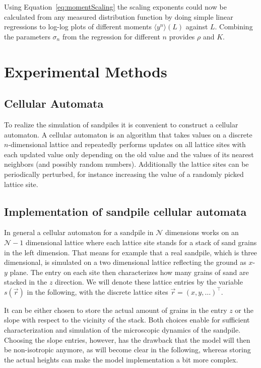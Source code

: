 Using Equation~\eqref{eq:momentScaling} the scaling exponents could now be calculated from any measured distribution
function by doing simple linear regressions to log-log plots of different moments $\langle y^n\rangle (L)$ against $L$.
Combining the parameters $\sigma_n$ from the regression for different $n$ provides $\rho$ and $K$.

\section{Experimental Methods}
\label{sec:experiment}

\subsection{Cellular Automata}
\label{sec:cellularAutomata}
To realize the simulation of sandpiles it is convenient to construct a cellular automaton.
A cellular automaton is an algorithm that takes values on a discrete $n$-dimensional lattice and repeatedly performs
updates on all lattice sites with each updated value only depending on the old value and the values of its nearest
neighbors (and possibly random numbers). Additionally the lattice sites can be periodically perturbed, for instance
increasing the value of a randomly picked lattice site.

\subsection{Implementation of sandpile cellular automata}
\label{sec:sandpileImplementation}
In general a cellular automaton for a sandpile in $\mathcal{N}$ dimensions works on an $\mathcal{N}-1$ dimensional
lattice where each lattice site stands for a stack of sand grains in the left dimension. That means for example that
a real sandpile, which is three dimensional, is simulated on a two dimensional lattice reflecting the ground as $x$-$y$
plane. The entry on each site then characterizes how many grains of sand are stacked in the $z$ direction.
We will denote these lattice entries by the variable $s(\vec{r})$ in the following, with the discrete lattice sites
$\vec{r}=(x,y,\ldots)^\top$.

It can be either chosen to store the actual amount of grains in the entry $z$ or the slope with respect to the
vicinity of the stack. Both choices enable for sufficient characterization and simulation of the microscopic
dynamics of the sandpile. Choosing the slope entries, however, has the drawback that the model will then be
non-isotropic anymore, as will become clear in the following, whereas storing the actual heights can make the model
implementation a bit more complex.

